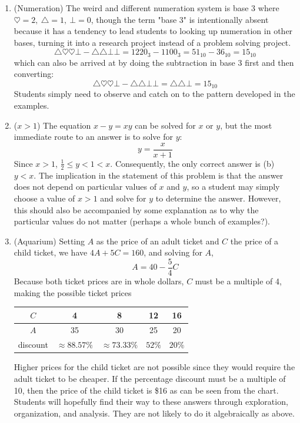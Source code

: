 {\begin{enumerate}
		\item (Numeration) The weird and different numeration system is base 3 where $\heartsuit=2,\ \triangle=1,\ \bot=0$, though the term "base 3" is intentionally absent because it has a tendency to lead students to looking up numeration in other bases, turning it into a research project instead of a problem solving project.
		$$\triangle\heartsuit\heartsuit\bot-\triangle\triangle\bot\bot=1220_3-1100_3=51_{10}-36_{10}=15_{10}$$ which can also be arrived at by doing the subtraction in base 3 first and then converting:
		$$\triangle\heartsuit\heartsuit\bot-\triangle\triangle\bot\bot=\triangle\triangle\bot=15_{10}$$
		Students simply need to observe and catch on to the pattern developed in the examples.
		
		\item ($x>1$) The equation $x-y=xy$ can be solved for $x$ or $y$, but the most immediate route to an answer is to solve for $y$:
		$$y=\frac{x}{x+1}$$
		Since $x>1$, $\frac12\leq y<1<x$. Consequently, the only correct answer is (b) $y<x$. The implication in the statement of this problem is that the answer does not depend on particular values of $x$ and $y$, so a student may simply choose a value of $x>1$ and solve for $y$ to determine the answer. However, this should also be accompanied by some explanation as to why the particular values do not matter (perhaps a whole bunch of examples?).

		\item (Aquarium) Setting $A$ as the price of an adult ticket and $C$ the price of a child ticket, we have $4A+5C=160$, and solving for $A$, 
		$$A=40-\frac54 C$$
		Because both ticket prices are in whole dollars, $C$ must be a multiple of 4, making the possible ticket prices
		\begin{center}
			\begin{tabular}{|c|c|c|c|c|}
				\hline
				$C$	& 4 & 8 & 12 & 16 \\
				\hline
				$A$ & 35 & 30 & 25 & 20 \\
				\hline
				discount & $\approx 88.57\%$ & $\approx 73.33\%$ & $52\%$ & $20\%$\\
				\hline
			\end{tabular}\par
		\end{center}
		Higher prices for the child ticket are not possible since they would require the adult ticket to be cheaper. If the percentage discount must be a multiple of 10, then the price of the child ticket is \$16 as can be seen from the chart. Students will hopefully find their way to these answers through exploration, organization, and analysis. They are not likely to do it algebraically as above.


\end{enumerate}}
